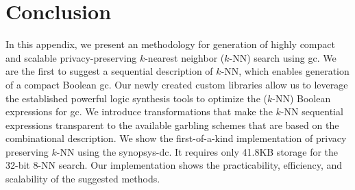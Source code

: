 \begin{table}
\centering
\caption{Circuit size and timing evaluation for $k$-NN search.}
\label{tab:k_nns}
\end{table}

\section{Conclusion}\label{sec:knn-conc}
In this appendix, we present an methodology for generation of highly compact and scalable privacy-preserving $k$-nearest neighbor ($k$-NN) search using \acrshort{gc}.
We are the first to suggest a sequential description of $k$-NN, which enables generation of a compact Boolean \acrshort{gc}.
Our newly created custom libraries allow us to leverage the established powerful logic synthesis tools to optimize the ($k$-NN) Boolean expressions for \acrshort{gc}.
We introduce transformations that make the $k$-NN sequential expressions transparent to the available garbling schemes that are based on the combinational description.
We show the first-of-a-kind implementation of privacy preserving $k$-NN using the \acrfull{synopsys-dc}.
It requires only 41.8KB storage for the 32-bit 8-NN search.
Our implementation shows the practicability, efficiency, and scalability of the suggested methods.
